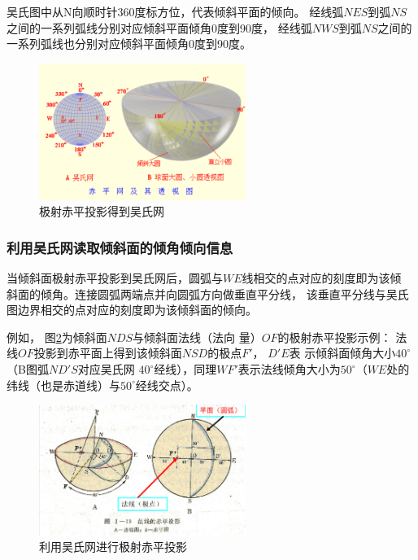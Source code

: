 \documentclass[a4paper,twoside]{ctexart}
\begin{document}
吴氏图中从N向顺时针360度标方位，代表倾斜平面的倾向。
经线弧$NES$到弧$NS$之间的一系列弧线分别对应倾斜平面倾角0度到90度，
经线弧$NWS$到弧$NS$之间的一系列弧线也分别对应倾斜平面倾角0度到90度。

\begin{figure}[htbp]
  \centering
    \includegraphics[width=0.6\textwidth]{pic/极射赤平投影得到吴氏网.png}
  \caption{极射赤平投影得到吴氏网}
  \label{fig:极射赤平投影得到吴氏网}
\end{figure}

\subsubsection{利用吴氏网读取倾斜面的倾角倾向信息}

当倾斜面极射赤平投影到吴氏网后，圆弧与$WE$线相交的点对应的刻度即为该倾
斜面的倾角。连接圆弧两端点并向圆弧方向做垂直平分线，
该垂直平分线与吴氏图边界相交的点对应的刻度即为该倾斜面的倾向。

例如，
图\ref{fig:利用吴氏网进行极射赤平投影}为倾斜面$NDS$与倾斜面法线（法向
量）$OF$的极射赤平投影示例：
法线$OF$投影到赤平面上得到该倾斜面$NSD$的极点$F'$， 
$D'E$表 示倾斜面倾角大小$40^{\circ}$（B图弧$ND'S$对应吴氏网
$40^{\circ}$经线），同理$WF'$表示法线倾角大小为$50^{\circ}$（$WE$处的
纬线（也是赤道线）与$50^{\circ}$经线交点）。 

\begin{figure}[htbp]
  \centering
    \includegraphics[width=0.6\textwidth]{pic/平面法向量直线投影.png}
  \caption{利用吴氏网进行极射赤平投影}
  \label{fig:利用吴氏网进行极射赤平投影}
\end{figure}
\end{document}
